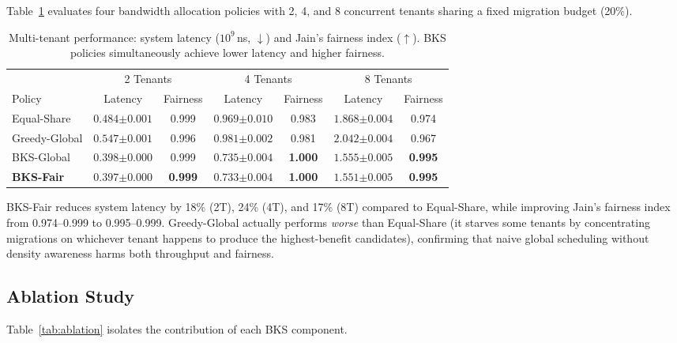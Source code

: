 \documentclass{article}
\begin{document}
Table~\ref{tab:multitenant} evaluates four bandwidth allocation policies with 2, 4, and 8 concurrent tenants sharing a fixed migration budget (20\%).

\begin{table}[t]
\caption{Multi-tenant performance: system latency ($10^9$\,ns, $\downarrow$) and Jain's fairness index ($\uparrow$). BKS policies simultaneously achieve lower latency and higher fairness.}
\label{tab:multitenant}
\centering
\small
\begin{tabular}{lcccccc}
\toprule
& \multicolumn{2}{c}{2 Tenants} & \multicolumn{2}{c}{4 Tenants} & \multicolumn{2}{c}{8 Tenants} \\
\cmidrule(lr){2-3} \cmidrule(lr){4-5} \cmidrule(lr){6-7}
Policy & Latency & Fairness & Latency & Fairness & Latency & Fairness \\
\midrule
Equal-Share & $0.484{\scriptstyle\pm0.001}$ & 0.999 & $0.969{\scriptstyle\pm0.010}$ & 0.983 & $1.868{\scriptstyle\pm0.004}$ & 0.974 \\
Greedy-Global & $0.547{\scriptstyle\pm0.001}$ & 0.996 & $0.981{\scriptstyle\pm0.002}$ & 0.981 & $2.042{\scriptstyle\pm0.004}$ & 0.967 \\
BKS-Global & $0.398{\scriptstyle\pm0.000}$ & 0.999 & $0.735{\scriptstyle\pm0.004}$ & \textbf{1.000} & $1.555{\scriptstyle\pm0.005}$ & \textbf{0.995} \\
\textbf{BKS-Fair} & $\mathbf{0.397}{\scriptstyle\pm0.000}$ & \textbf{0.999} & $\mathbf{0.733}{\scriptstyle\pm0.004}$ & \textbf{1.000} & $\mathbf{1.551}{\scriptstyle\pm0.005}$ & \textbf{0.995} \\
\bottomrule
\end{tabular}
\end{table}

BKS-Fair reduces system latency by 18\% (2T), 24\% (4T), and 17\% (8T) compared to Equal-Share, while improving Jain's fairness index from 0.974--0.999 to 0.995--0.999. Greedy-Global actually performs \emph{worse} than Equal-Share (it starves some tenants by concentrating migrations on whichever tenant happens to produce the highest-benefit candidates), confirming that naive global scheduling without density awareness harms both throughput and fairness.

\subsection{Ablation Study}
\label{sec:ablation}

Table~\ref{tab:ablation} isolates the contribution of each BKS component.
\end{document}
